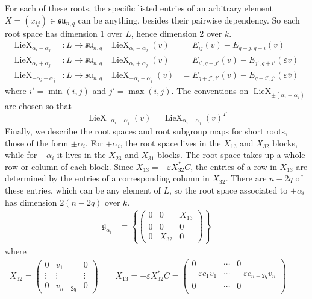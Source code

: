 \documentclass[12pt]{article}
\theoremstyle{definition}
\numberwithin{theorem}{subsection}
\newcommand{\eps}{\varepsilon}
\newcommand{\lb}{\left\{}
\newcommand{\rb}{\right\}}
\newcommand{\ov}{\overline}
\newcommand{\frakg}{\mathfrak{g}}
\newcommand{\fraksu}{\mathfrak{su}}
\DeclareMathOperator{\LieX}{LieX}
\begin{document}
For each of these roots, the specific listed entries of an arbitrary element $X = (x_{ij}) \in \fraksu_{n,q}$ can be anything, besides their pairwise dependency. So each root space has dimension 1 over $L$, hence dimension 2 over $k$.
\begin{align*}
	\LieX_{\alpha_i - \alpha_j}&:L \to \fraksu_{n,q} & \LieX_{\alpha_i -\alpha_j}(v) &= E_{ij}(v) - E_{q+j,q+i}(\ov v) \\
	\LieX_{\alpha_i + \alpha_j}&:L \to \fraksu_{n,q} & \LieX_{\alpha_i + \alpha_j}(v) &= E_{i',q+j'}(v) - E_{j',q+i'}( \eps \ov v) \\
	\LieX_{-\alpha_i - \alpha_j}&:L \to \fraksu_{n,q} & \LieX_{-\alpha_i - \alpha_j}(v) &= E_{q+j',i'}(v) - E_{q+i',j'}(\eps \ov v)
\end{align*}
where $i' = \min(i,j)$ and $j' = \max(i,j)$. The conventions on $\LieX_{\pm (\alpha_i + \alpha_j)}$ are chosen so that
\[
	\LieX_{-\alpha_i - \alpha_j}(v) = \LieX_{\alpha_i + \alpha_j}(v)^T
\]
Finally, we describe the root spaces and root subgroup maps for short roots, those of the form $\pm \alpha_i$. For $+\alpha_i$, the root space lives in the $X_{13}$ and $X_{32}$ blocks, while for $-\alpha_i$ it lives in the $X_{23}$ and $X_{31}$ blocks. The root space takes up a whole row or column of each block. Since $X_{13} = - \eps X_{32}^* C$, the entries of a row in $X_{13}$ are determined by the entries of a corresponding column in $X_{32}$. There are $n-2q$ of these entries, which can be any element of $L$, so the root space associated to $\pm \alpha_i$ has dimension $2(n-2q)$ over $k$.
\begin{align*}
	\frakg_{\alpha_i} &= \lb 
	\begin{pmatrix}
		0 & 0 & X_{13} \\
		0 & 0 & 0 \\
		0 & X_{32} & 0
	\end{pmatrix}
	\rb
\end{align*}
where
\begin{align*}
	X_{32} =
	\begin{pmatrix}
		0 & v_1 & 0 \\
		\vdots & \vdots & \vdots \\
		0 & v_{n-2q} & 0
	\end{pmatrix}
	\qquad
	X_{13} = - \eps X_{32}^* C =
	\begin{pmatrix}
		0 & \cdots & 0 \\
		- \eps c_1 \ov v_1 & \cdots & - \eps c_{n-2q} \ov v_n \\
		0 & \cdots & 0 \\
	\end{pmatrix}
	\qquad
\end{align*}
\end{document}

